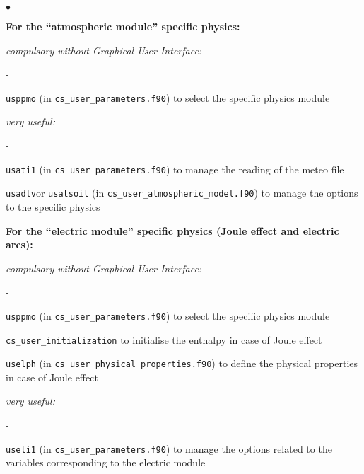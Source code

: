 {{{\begin{list}{$\bullet$}{}
\begin{list}{}{}
     \item{\bf For the ``atmospheric module'' specific physics:}

    \begin{list}{}{}
       \item {\em compulsory without Graphical User Interface:}
        \begin{list}{-}{}
            \item \texttt{usppmo} (in \texttt{cs\_user\_parameters.f90})
                  to select the specific physics module
        \end{list}

        \item {\em very useful:}
        \begin{list}{-}{}
            \item  \texttt{usati1} (in \texttt{cs\_user\_parameters.f90})
                   to manage the reading of the meteo file
           \item  \texttt{usadtv}or \texttt{usatsoil} (in \texttt{cs\_user\_atmospheric\_model.f90})
                   to manage the options to the specific physics

        \end{list}
    \end{list}


     \item{\bf For the ``electric module'' specific physics
      (Joule effect and electric arcs):}

    \begin{list}{}{}
       \item {\em compulsory without Graphical User Interface:}
        \begin{list}{-}{}
            \item \texttt{usppmo} (in \texttt{cs\_user\_parameters.f90})
                  to select the specific physics module

            \item \texttt{cs\_user\_initialization} to initialise the enthalpy in
                  case of Joule effect

            \item \texttt{uselph} (in \texttt{cs\_user\_physical\_properties.f90})
                  to define the physical
                  properties in case of Joule effect
        \end{list}

        \item {\em very useful:}
        \begin{list}{-}{}
            \item  \texttt{useli1} (in \texttt{cs\_user\_parameters.f90})
                   to manage the options related
                   to the variables corresponding to the electric module


\end{list}
\end{list}
\end{list}
\end{list}}}}
